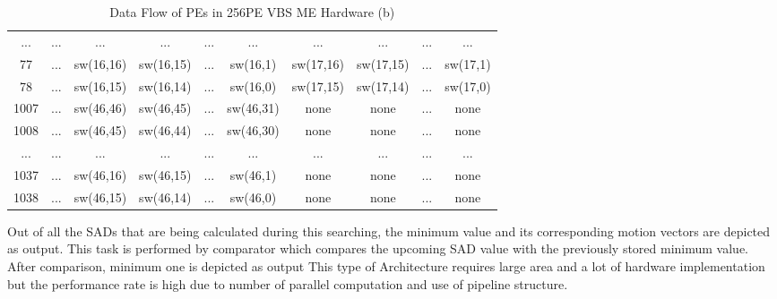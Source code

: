 \begin{table}[H]
\begin{tabular}{|c|c|c|c|c|c|c|c|c|c|}
		... & ... & ... & ... & ... & ... & ... & ... & ... & ... \\
		
		77 & ... & sw(16,16) & sw(16,15) & ... & sw(16,1) & sw(17,16) & sw(17,15) & ... & sw(17,1) \\
		
		78 & ... & sw(16,15) & sw(16,14) & ... & sw(16,0) & sw(17,15) & sw(17,14) & ... & sw(17,0)  \\
		
		\hline
		
		1007 & ... & sw(46,46) & sw(46,45) & ... & sw(46,31) & none & none & ... & none \\
		
		1008 & ... & sw(46,45) & sw(46,44) & ... & sw(46,30) & none & none & ... & none \\
		
		... & ... & ... & ... & ... & ... & ... & ... & ... & ... \\
		
		1037 & ... & sw(46,16) & sw(46,15) & ... & sw(46,1) & none & none & ... & none \\
		
		1038 & ... & sw(46,15) & sw(46,14) & ... & sw(46,0) & none & none & ... & none  \\
		
		\hline
	\end{tabular}
	\caption{ Data Flow of PEs in 256PE VBS ME Hardware (b)}
	\label{tab:dataflow2}
\end{table}

Out of all the SADs that are being calculated during this searching, the minimum value and its corresponding motion vectors are depicted as output. This task is performed by comparator which compares the upcoming SAD value with the previously stored minimum value. After comparison, minimum one is depicted as output This type of Architecture requires large area and a lot of hardware implementation but the performance rate is high due to number of parallel computation and use of pipeline structure.